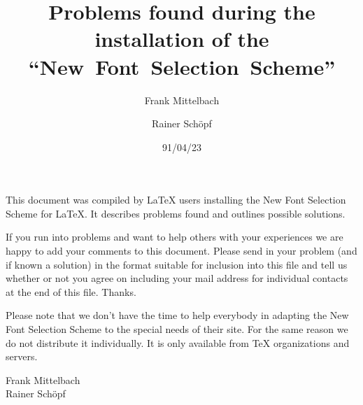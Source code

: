

\def\filedate{91/04/23}


\newcommand{\ams}{{\the\textfont2 A}\kern-.1667em\lower.5ex\hbox
 {\the\textfont2 M}\kern-.125em{\the\textfont2 S}}
\newcommand\amslatex{\ams-\LaTeX}
\newcommand\amstex{\ams-\TeX}

\makeatletter
\newenvironment{comment}[2]{\begin{flushleft}%
  \rightskip 1em plus 1em minus 1em
  \@rightskip 1em plus 1em minus 1em
  {\bf #1} (#2):\quad}%
 {\end{flushleft}}
\makeatother

\newenvironment{remark}[2]{\begin{flushleft}%
  {\bf Remark} #1 (#2):\quad\sl}%
 {\end{flushleft}}


\title{Problems found during the installation of the
         ``New~Font~Selection~Scheme''}
\author{Frank Mittelbach \and Rainer Sch\"opf}
\date{\filedate}

\maketitle

\noindent
This document was compiled by \LaTeX{} users installing the
New Font Selection Scheme for \LaTeX{}. It describes problems found
and outlines possible solutions.

If you run into problems and want to help others with your
experiences we are happy to add your comments to this document.
Please send in your problem (and if known a solution) in the format
suitable for inclusion into this file and tell us whether or not
you agree on including your mail address for individual contacts
at the end of this file. Thanks.

Please note that we don't have the time to help
everybody in adapting the New Font Selection Scheme to
the special needs of their site. For the same reason we
do not distribute it individually. It is only available
from \TeX{} organizations and servers.

\begin{flushright}
  Frank Mittelbach\\
  Rainer Sch\"opf
\end{flushright}

